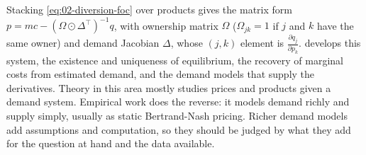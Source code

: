 Stacking \eqref{eq:02-diversion-foc} over products gives the matrix form $p = mc - (\Omega \odot \Delta^\top)^{-1}q$,
with ownership matrix $\Omega$ ($\Omega_{jk} = 1$ if $j$ and $k$ have the same owner) and demand Jacobian $\Delta$,
whose $(j,k)$ element is $\frac{\partial q_j}{\partial p_k}$.  develops this system, the existence
and uniqueness of equilibrium, the recovery of marginal costs from estimated demand, and the demand models that
supply the derivatives. Theory in this area mostly studies prices and products given a demand system. Empirical work
does the reverse: it models demand richly and supply simply, usually as static Bertrand-Nash pricing. Richer demand
models add assumptions and computation, so they should be judged by what they add for the question at hand and the
data available.
